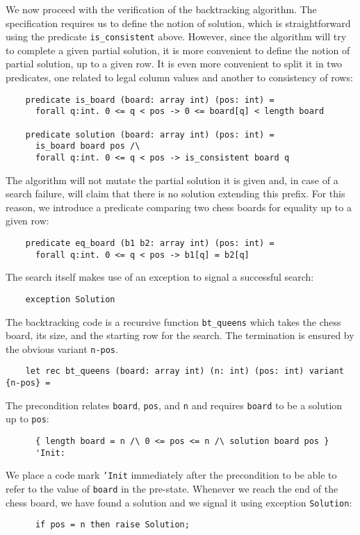 We now proceed with the verification of the backtracking algorithm.
The specification requires us to define the notion of solution, which
is straightforward using the predicate \verb|is_consistent| above.
However, since the algorithm will try to complete a given partial
solution, it is more convenient to define the notion of partial
solution, up to a given row. It is even more convenient to split it in
two predicates, one related to legal column values and another to
consistency of rows:
\begin{verbatim}
    predicate is_board (board: array int) (pos: int) =
      forall q:int. 0 <= q < pos -> 0 <= board[q] < length board

    predicate solution (board: array int) (pos: int) =
      is_board board pos /\
      forall q:int. 0 <= q < pos -> is_consistent board q
\end{verbatim}
The algorithm will not mutate the partial solution it is given and,
in case of a search failure, will claim that there is no solution
extending this prefix. For this reason, we introduce a predicate
comparing two chess boards for equality up to a given row:
\begin{verbatim}
    predicate eq_board (b1 b2: array int) (pos: int) =
      forall q:int. 0 <= q < pos -> b1[q] = b2[q]
\end{verbatim}
The search itself makes use of an exception to signal a successful search:
\begin{verbatim}
    exception Solution
\end{verbatim}
The backtracking code is a recursive function \verb|bt_queens| which
takes the chess board, its size, and the starting row for the search.
The termination is ensured by the obvious variant \texttt{n-pos}.
\begin{verbatim}
    let rec bt_queens (board: array int) (n: int) (pos: int) variant {n-pos} =
\end{verbatim}
The precondition relates \texttt{board}, \texttt{pos}, and \texttt{n}
and requires \texttt{board} to be a solution up to \texttt{pos}:
\begin{verbatim}
      { length board = n /\ 0 <= pos <= n /\ solution board pos }
      'Init:
\end{verbatim}
We place a code mark \texttt{'Init} immediately after the precondition to
be able to refer to the value of \texttt{board} in the pre-state.
Whenever we reach the end of the chess board, we have found a solution
and we signal it using exception \texttt{Solution}:
\begin{verbatim}
      if pos = n then raise Solution;
\end{verbatim}
